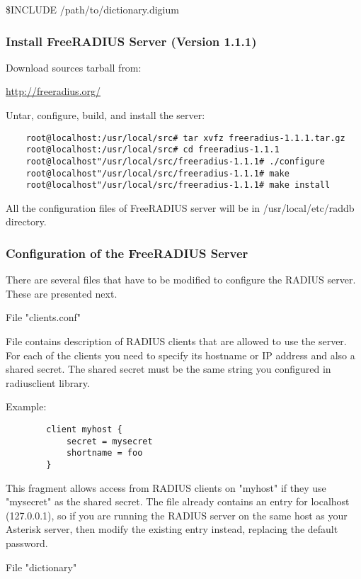 		\$INCLUDE /path/to/dictionary.digium

\subsubsection{Install FreeRADIUS Server (Version 1.1.1)}
 
	Download sources tarball from:

		\url{http://freeradius.org/}
			
	Untar, configure, build, and install the server:

\begin{verbatim}
	root@localhost:/usr/local/src# tar xvfz freeradius-1.1.1.tar.gz
	root@localhost:/usr/local/src# cd freeradius-1.1.1
	root@localhost"/usr/local/src/freeradius-1.1.1# ./configure
	root@localhost"/usr/local/src/freeradius-1.1.1# make
	root@localhost"/usr/local/src/freeradius-1.1.1# make install
\end{verbatim}

	All the configuration files of FreeRADIUS server will be in 
	/usr/local/etc/raddb directory. 
		

\subsubsection{Configuration of the FreeRADIUS Server}
			
	There are several files that have to be modified to configure the
	RADIUS server. These are presented next.

	File "clients.conf"
			
	File  contains description of 
	RADIUS clients that are allowed to use the server. For each of the 
	clients you need to specify its hostname or IP address and also a 
	shared secret. The shared secret must be the same string you configured
	in radiusclient library.

	Example:
\begin{verbatim}
		client myhost {
		    secret = mysecret
		    shortname = foo
		}
\end{verbatim}	

	This fragment allows access from RADIUS clients on "myhost" if they use 
	"mysecret" as the shared secret.	 
	The file already contains an entry for localhost (127.0.0.1), so if you
	are running the RADIUS server on the same host as your Asterisk server,
	then modify the existing entry instead, replacing the default password.
		
	File "dictionary"
		
